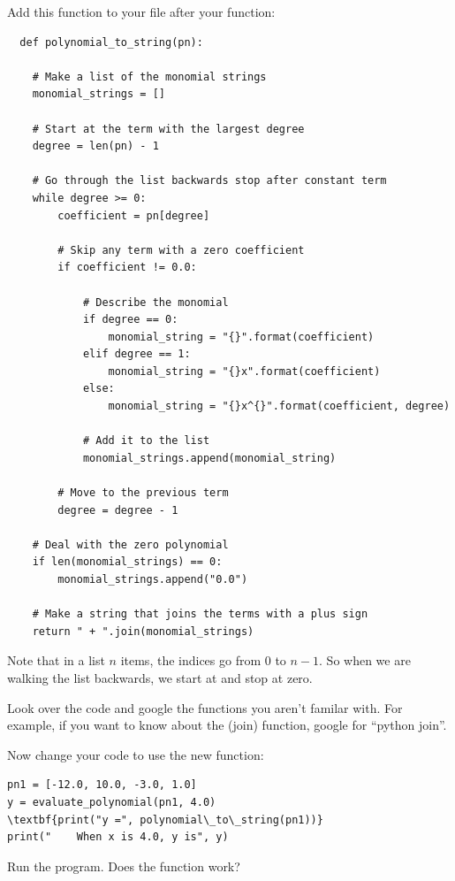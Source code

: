 Add this function to your  file after your  function:
\begin{Verbatim}
  def polynomial_to_string(pn):
    
    # Make a list of the monomial strings
    monomial_strings = []

    # Start at the term with the largest degree
    degree = len(pn) - 1

    # Go through the list backwards stop after constant term
    while degree >= 0:
        coefficient = pn[degree]

        # Skip any term with a zero coefficient
        if coefficient != 0.0:

            # Describe the monomial
            if degree == 0:
                monomial_string = "{}".format(coefficient)
            elif degree == 1:
                monomial_string = "{}x".format(coefficient)
            else:
                monomial_string = "{}x^{}".format(coefficient, degree)
                
            # Add it to the list
            monomial_strings.append(monomial_string)

        # Move to the previous term
        degree = degree - 1

    # Deal with the zero polynomial
    if len(monomial_strings) == 0:
        monomial_strings.append("0.0")
    
    # Make a string that joins the terms with a plus sign
    return " + ".join(monomial_strings)
\end{Verbatim}

Note that in a list $n$ items, the indices go from 0 to $n-1$. So when
we are walking the list backwards, we start at  and stop at zero.

Look over the code and google the functions you aren't familar
with. For example, if you want to know about the \pyfunction(join)
function, google for ``python join''.

Now change your code to use the new function:
\begin{Verbatim}[commandchars=\\\{\}]
pn1 = [-12.0, 10.0, -3.0, 1.0]
y = evaluate_polynomial(pn1, 4.0)
\textbf{print("y =", polynomial\_to\_string(pn1))}
print("    When x is 4.0, y is", y)
\end{Verbatim}

Run the program. Does the function work?

